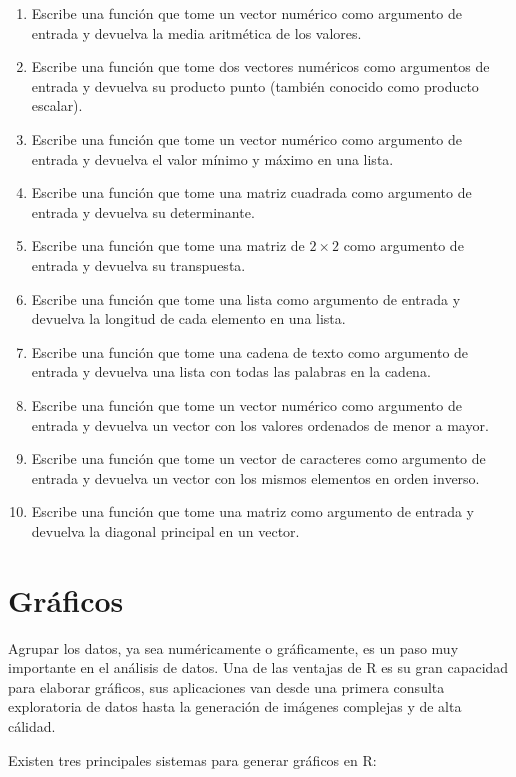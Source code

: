 \documentclass[
]{book}
\begin{document}
\begin{enumerate}
\def\labelenumi{\arabic{enumi}.}
\item
  Escribe una función que tome un vector numérico como argumento de entrada y devuelva la media aritmética de los valores.
\item
  Escribe una función que tome dos vectores numéricos como argumentos de entrada y devuelva su producto punto (también conocido como producto escalar).
\item
  Escribe una función que tome un vector numérico como argumento de entrada y devuelva el valor mínimo y máximo en una lista.
\item
  Escribe una función que tome una matriz cuadrada como argumento de entrada y devuelva su determinante.
\item
  Escribe una función que tome una matriz de \(2 \times 2\) como argumento de entrada y devuelva su transpuesta.
\item
  Escribe una función que tome una lista como argumento de entrada y devuelva la longitud de cada elemento en una lista.
\item
  Escribe una función que tome una cadena de texto como argumento de entrada y devuelva una lista con todas las palabras en la cadena.
\item
  Escribe una función que tome un vector numérico como argumento de entrada y devuelva un vector con los valores ordenados de menor a mayor.
\item
  Escribe una función que tome un vector de caracteres como argumento de entrada y devuelva un vector con los mismos elementos en orden inverso.
\item
  Escribe una función que tome una matriz como argumento de entrada y devuelva la diagonal principal en un vector.
\end{enumerate}

\chapter{Gráficos}\label{plots}

Agrupar los datos, ya sea numéricamente o gráficamente, es un paso muy importante en el análisis de datos. Una de las ventajas de R es su gran capacidad para elaborar gráficos, sus aplicaciones van desde una primera consulta exploratoria de datos hasta la generación de imágenes complejas y de alta cálidad.

Existen tres principales sistemas para generar gráficos en R:
\end{document}
